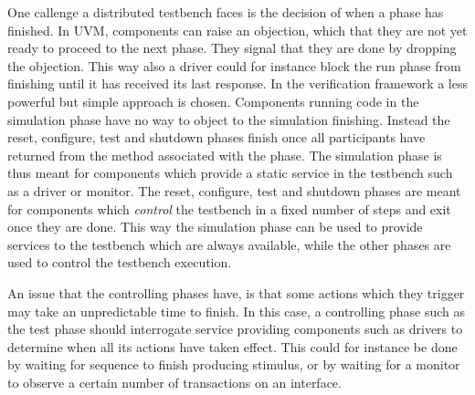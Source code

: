 One callenge a distributed testbench faces is the decision of when a phase has finished. In UVM, components can raise
an objection, which that they are not yet ready to proceed to the next phase. They signal that they are done by
dropping the objection. This way also a driver could for instance block the run phase from finishing until it has
received its last response. In the verification framework a less powerful but simple approach is chosen. Components
running code in the simulation phase have no way to object to the simulation finishing. Instead the reset, configure,
test and shutdown phases finish once all participants have returned from the method associated with the phase. The
simulation phase is thus meant for components which provide a static service in the testbench such as a driver or
monitor. The reset, configure, test and shutdown phases are meant for components which \textit{control} the testbench
in a fixed number of steps and exit once they are done. This way the simulation phase can be used to provide services
to the testbench which are always available, while the other phases are used to control the testbench execution.

An issue that the controlling phases have, is that some actions which they trigger may take an unpredictable time to
finish. In this case, a controlling phase such as the test phase should interrogate service providing components such
as drivers to determine when all its actions have taken effect. This could for instance be done by waiting for
sequence to finish producing stimulus, or by waiting for a monitor to observe a certain number of transactions on an interface.


